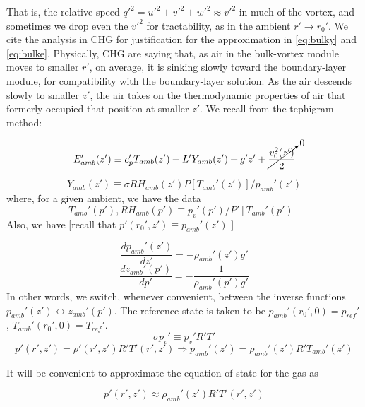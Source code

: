 \documentclass[preprint, prX]{revtex4}
\newcommand{\dd}[2]{\frac{d#1}{d#2}}
\begin{document}
\begin{itemize}
That is, the relative speed $q'^2 = u'^2 + v'^2 + w'^2 \approx v'^2$ in much of the vortex, and sometimes we drop even the $v'^2$ for tractability, as in the ambient $r' \to r_0'$. We cite the analysis in CHG for justification for the approximation in \eqref{eq:bulky} and \eqref{eq:bulke}. Physically, CHG are saying that, as air in the bulk-vortex module moves to smaller $r'$, on average, it is sinking slowly toward the boundary-layer module, for compatibility with the boundary-layer solution. As the air descends slowly to smaller $z'$, the air takes on the thermodynamic properties of air that formerly occupied that position at smaller $z'$. We recall from the tephigram method:

\begin{equation}
	E_{amb}'(z') \equiv c_p' T_{amb}(z') + L' Y_{amb}(z') + g' z' + \cancelto{0}{\frac{v_0^2(z')}{2}}
\end{equation}

\begin{equation}
	Y_{amb}(z') \equiv \sigma RH_{amb}(z') P[T_{amb}'(z')] / p_{amb}'(z')
\end{equation}
where, for a given ambient, we have the data
\begin{equation}
	T_{amb}'(p'), RH_{amb}(p') \equiv p_v'(p')/P'[T_{amb}'(p')]
\end{equation}
Also, we have [recall that $p'(r_0', z') \equiv p_{amb}'(z')$ ]

\begin{equation}
	\dd{p_{amb}'(z')}{z'} = -\rho_{amb}'(z') g'
	\label{eq:bulkdpambdz}
\end{equation}
\begin{equation}
	\dd{z_{amb}'(p')}{p'} = - \frac{1}{\rho_{amb}'(p') g'}
\end{equation}
In other words, we switch, whenever convenient, between the inverse functions $p_{amb}'(z') \leftrightarrow z_{amb}'(p')$. The reference state is taken to be $p_{amb}'(r_0', 0) = p_{ref}'$, $T_{amb}'(r_0', 0) = T_{ref}'$.
\begin{equation}
	\sigma p_v' \equiv p_v' R' T'
\end{equation}
\begin{equation}
	p'(r',z') = \rho'(r',z')R'T'(r',z') \Rightarrow p_{amb}'(z') = \rho_{amb}'(z') R'T_{amb}'(z')
\end{equation}

It will be convenient to approximate the equation of state for the gas as 

\begin{equation}
	p'(r',z') \approx \rho_{amb}'(z') R' T'(r',z')
\end{equation}


\end{itemize}
\end{document}
